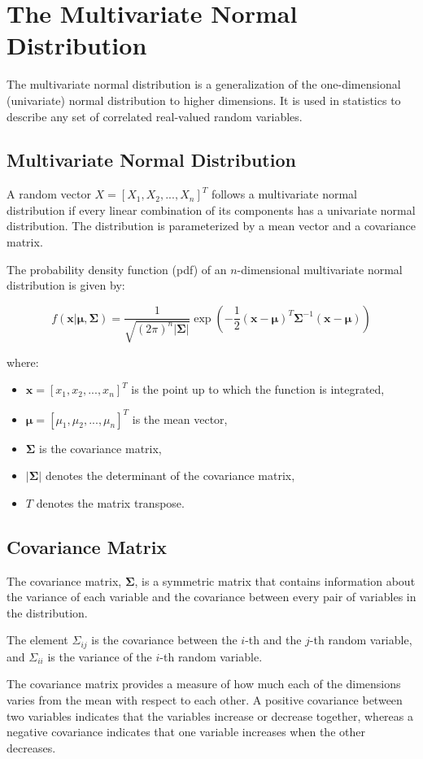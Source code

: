 \chapter{The Multivariate Normal Distribution}

The multivariate normal distribution is a generalization of the one-dimensional (univariate) normal distribution to higher dimensions. It is used in statistics to describe any set of correlated real-valued random variables.

\section{Multivariate Normal Distribution}
A random vector $X = [X_1, X_2, ..., X_n]^T$ follows a multivariate normal distribution if every linear combination of its components has a univariate normal distribution. The distribution is parameterized by a mean vector and a covariance matrix.

The probability density function (pdf) of an $n$-dimensional multivariate normal distribution is given by:

\begin{equation*}
f(\mathbf{x}|\boldsymbol\mu, \mathbf{\Sigma}) = \frac{1}{\sqrt{(2\pi)^n|\mathbf{\Sigma}|}}\exp\left(-\frac{1}{2}(\mathbf{x}-\boldsymbol\mu)^T\mathbf{\Sigma}^{-1}(\mathbf{x}-\boldsymbol\mu)\right)
\end{equation*}

where:
\begin{itemize}
\item $\mathbf{x} = [x_1, x_2, ..., x_n]^T$ is the point up to which the function is integrated,
\item $\boldsymbol\mu = [\mu_1, \mu_2, ..., \mu_n]^T$ is the mean vector,
\item $\mathbf{\Sigma}$ is the covariance matrix,
\item $|\mathbf{\Sigma}|$ denotes the determinant of the covariance matrix,
\item $T$ denotes the matrix transpose.
\end{itemize}

\section{Covariance Matrix}
The covariance matrix, $\mathbf{\Sigma}$, is a symmetric matrix that contains information about the variance of each variable and the covariance between every pair of variables in the distribution.

The element $\Sigma_{ij}$ is the covariance between the $i$-th and the $j$-th random variable, and $\Sigma_{ii}$ is the variance of the $i$-th random variable.

The covariance matrix provides a measure of how much each of the dimensions varies from the mean with respect to each other. A positive covariance between two variables indicates that the variables increase or decrease together, whereas a negative covariance indicates that one variable increases when the other decreases.